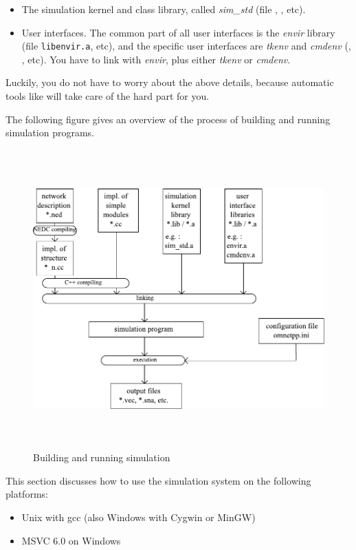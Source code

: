 \begin{itemize}
  \item{The simulation kernel and class library,
    called \textit{sim\_std} (file , , etc).}
  \item{User interfaces. The common part of all user interfaces is
    the \textit{envir} library (file \texttt{libenvir.a}, etc),
    and the specific user interfaces are \textit{tkenv} and \textit{cmdenv}
    (, , etc). You have to link
    with \textit{envir}, plus either \textit{tkenv} or \textit{cmdenv}.}
\end{itemize}

Luckily, you do not have to worry about the above details, because
automatic tools like  will take care of the hard
part for you.

The following figure gives an overview of the process of building
and running simulation programs.

\begin{figure}[htbp]
  \begin{center}
    \includegraphics[width=5.992in, height=4.519in]{figures/usmanFig17}
    \caption{Building and running simulation}
  \end{center}
\end{figure}


This section discusses how to use the simulation system on the
following platforms:
\begin{itemize}
  \item{Unix with gcc (also Windows with Cygwin or MinGW)}
  \item{MSVC 6.0 on Windows}
\end{itemize}




